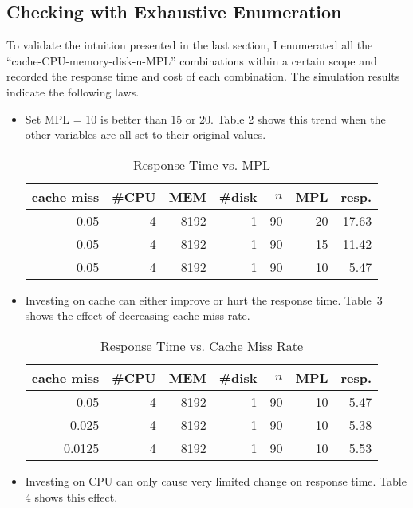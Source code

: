 \documentclass[12pt,letterpaper]{article}
\begin{document}
\subsection{Checking with Exhaustive Enumeration}
To validate the intuition presented in the last section, I enumerated all the ``cache-CPU-memory-disk-n-MPL'' combinations within a certain scope and recorded the response time and cost of each combination. The simulation results indicate the following laws.
\begin{itemize}
\item Set MPL = 10 is better than 15 or 20. Table 2 shows this trend when the other variables are all set to their original values.
\begin{table}
\begin{center}
\caption{Response Time vs. MPL}
\vspace{0.5ex}
\begin{tabular}{r|r|r|r|r|r|r}
cache miss & \#CPU & MEM & \#disk & $n$ & MPL & resp.\\
\hline
0.05 & 4 & 8192 & 1 & 90 & 20 & 17.63\\
0.05 & 4 & 8192 & 1 & 90 & 15 & 11.42\\
0.05 & 4 & 8192 & 1 & 90 & 10 & 5.47\\
\end{tabular}
\end{center}
\end{table}
\item Investing on cache can either improve or hurt the response time. Table~3 shows the effect of decreasing cache miss rate.
\begin{table}
\begin{center}
\caption{Response Time vs. Cache Miss Rate}
\vspace{0.5ex}
\begin{tabular}{r|r|r|r|r|r|r}
cache miss & \#CPU & MEM & \#disk & $n$ & MPL & resp.\\
\hline
0.05 & 4 & 8192 & 1 & 90 & 10 & 5.47\\
0.025 & 4 & 8192 & 1 & 90 & 10 & 5.38\\
0.0125 & 4 & 8192 & 1 & 90 & 10 & 5.53\\
\end{tabular}
\end{center}
\end{table}
\item Investing on CPU can only cause very limited change on response time. Table 4 shows this effect.
\begin{table}

\end{table}
\end{itemize}
\end{document}
